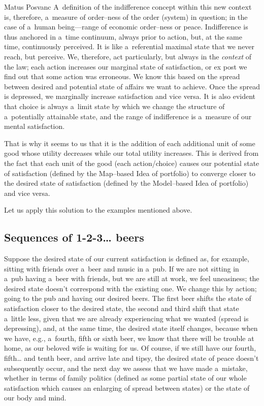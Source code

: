 \begin{artengenv}{Matus Posvanc}
A~definition of the indifference concept within this new context is, therefore, a~measure of order–ness of the order (system) in question; in the case of a~human being---range of economic order–ness or peace. Indifference is thus anchored in a~time continuum, always prior to action, but, at the same time, continuously perceived. It is like a~referential maximal state that we never reach, but perceive. We, therefore, act particularly, but always in the \textit{context} of the law; each action increases our marginal state of satisfaction, or ex post we find out that some action was erroneous. We know this based on the spread between desired and potential state of affairs we want to achieve. Once the spread is depressed, we marginally increase satisfaction and vice versa. It is also evident that choice is always a~limit state by which we change the structure of a~potentially attainable state, and the range of indifference is a~measure of our mental satisfaction.



That is why it seems to us that it is the addition of each additional unit of some good whose utility decreases while our total utility increases. This is derived from the fact that each unit of the good (each action/choice) causes our potential state of satisfaction (defined by the Map–based Idea of portfolio) to converge closer to the desired state of satisfaction (defined by the Model–based Idea of portfolio) and vice versa.



Let us apply this solution to the examples mentioned above.



\subsection*{Sequences of 1-2-3… beers }



Suppose the desired state of our current satisfaction is defined as, for example, sitting with friends over a~beer and music in a~pub. If we are not sitting in a~pub having a~beer with friends, but we are still at work, we feel uneasiness; the desired state doesn't correspond with the existing one. We change this by action; going to the pub and having our desired beers. The first beer shifts the state of satisfaction closer to the desired state, the second and third shift that state a~little less, given that we are already experiencing what we wanted (spread is depressing), and, at the same time, the desired state itself changes, because when we have, e.g., a~fourth, fifth or sixth beer, we know that there will be trouble at home, as our beloved wife is waiting for us. Of course, if we still have our fourth, fifth… and tenth beer, and arrive late and tipsy, the desired state of peace doesn't subsequently occur, and the next day we assess that we have made a~mistake, whether in terms of family politics (defined as some partial state of our whole satisfaction which causes an enlarging of spread between states) or the state of our body and mind.




\end{artengenv}
